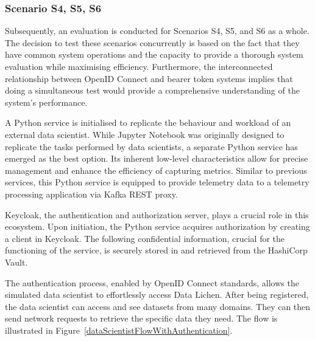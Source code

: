 \documentclass[preprint,12pt]{elsarticle}
\begin{document}
\subsubsection{Scenario S4, S5, S6}

Subsequently, an evaluation is conducted for Scenarios S4, S5, and S6 as a whole. The decision to test these scenarios concurrently is based on the fact that they have common system operations and the capacity to provide a thorough system evaluation while maximising efficiency. Furthermore, the interconnected relationship between OpenID Connect and bearer token systems implies that doing a simultaneous test would provide a comprehensive understanding of the system's performance.

A Python service is initialised to replicate the behaviour and workload of an external data scientist. While Jupyter Notebook was originally designed to replicate the tasks performed by data scientists, a separate Python service has emerged as the best option. Its inherent low-level characteristics allow for precise management and enhance the efficiency of capturing metrics. Similar to previous services, this Python service is equipped to provide telemetry data to a telemetry processing application via Kafka REST proxy. 

Keycloak, the authentication and authorization server, plays a crucial role in this ecosystem. Upon initiation, the Python service acquires authorization by creating a client in Keycloak. The following confidential information, crucial for the functioning of the service, is securely stored in and retrieved from the HashiCorp Vault. 

The authentication process, enabled by OpenID Connect standards, allows the simulated data scientist to effortlessly access Data Lichen. After being registered, the data scientist can access and see datasets from many domains. They can then send network requests to retrieve the specific data they need. The flow is illustrated in Figure~\ref{dataScientistFlowWithAuthentication}.
\end{document}
